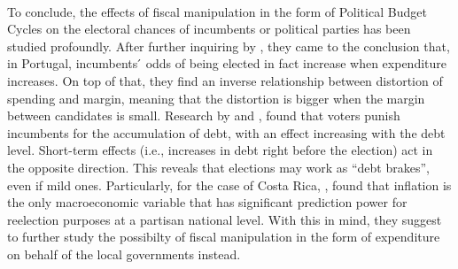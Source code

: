 \\
To conclude, the effects of fiscal manipulation in the form of Political Budget Cycles on the electoral chances of incumbents or political parties has been studied profoundly. After further inquiring by \textcite{aidt2011}, they came to the conclusion that, in Portugal, incumbents ́ odds of being elected in fact increase when expenditure increases. On top of that, they find an inverse relationship between distortion of spending and margin, meaning that the distortion is bigger when the margin between candidates is small. Research by \textcite{drazen2010} and \textcite{cassette2014}, found that voters punish incumbents for the accumulation of debt, with an effect increasing with the debt level. Short-term effects (i.e., increases in debt right before the election) act in the opposite direction. This reveals that elections may work as “debt brakes”, even if mild ones. Particularly, for the case of Costa Rica, \textcite{hernandez2014}, found that inflation is the only macroeconomic variable that has significant prediction power for reelection purposes at a partisan national level. With this in mind, they suggest to further study the possibilty of fiscal manipulation in the form of expenditure on behalf of the local governments instead.

